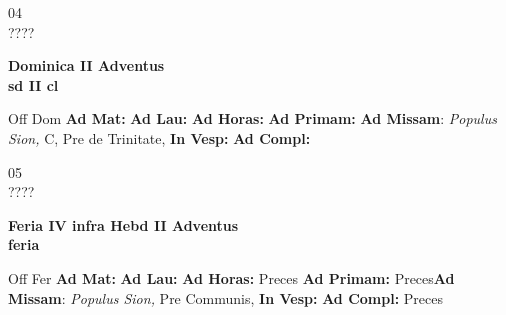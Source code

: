 \documentclass[10pt, openany]{book}
\begin{document}
    \begin{center}
        \begin{minipage}{3.5in}
            \vspace{2em}
            \begin{minipage}{0.5in}
                {\Huge 04} \\
                {\normalsize ????}
            \end{minipage}
            \begin{minipage}{3.0in}
                \textbf{ \large Dominica II Adventus \\
                \textnormal{\normalsize sd II cl}}

            \end{minipage}
            \begin{justify}Off Dom
                \textbf{Ad Mat: }
                \textbf{Ad Lau: }
                \textbf{Ad Horas: }
                \textbf{Ad Primam: }\textbf{Ad Missam}: \textit{Populus Sion,} C, Pre de Trinitate, 
                \textbf{In Vesp: }
                \textbf{Ad Compl: }
            \end{justify}
        \end{minipage}
    \end{center}

    \begin{center}
        \begin{minipage}{3.5in}
            \vspace{2em}
            \begin{minipage}{0.5in}
                {\Huge 05} \\
                {\normalsize ????}
            \end{minipage}
            \begin{minipage}{3.0in}
                \textbf{ \large Feria IV infra Hebd II Adventus \\
                \textnormal{\normalsize feria}}

            \end{minipage}
            \begin{justify}Off Fer
                \textbf{Ad Mat: }
                \textbf{Ad Lau: }
                \textbf{Ad Horas: }Preces
                \textbf{Ad Primam: }Preces\textbf{Ad Missam}: \textit{Populus Sion,} Pre Communis, 
                \textbf{In Vesp: }
                \textbf{Ad Compl: }Preces
            \end{justify}
        \end{minipage}
    \end{center}
\end{document}

